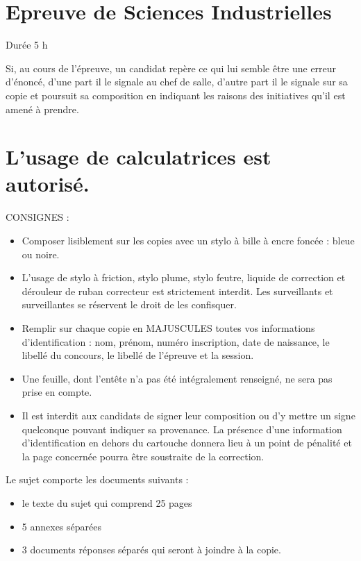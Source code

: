 \documentclass[10pt]{article}
\begin{document}
\captionsetup{singlelinecheck=false}
\section*{Epreuve de Sciences Industrielles}
Durée 5 h

Si, au cours de l'épreuve, un candidat repère ce qui lui semble être une erreur d'énoncé, d'une part il le signale au chef de salle, d'autre part il le signale sur sa copie et poursuit sa composition en indiquant les raisons des initiatives qu'il est amené à prendre.

\section*{L'usage de calculatrices est autorisé.}
CONSIGNES :

\begin{itemize}
  \item[-] Composer lisiblement sur les copies avec un stylo à bille à encre foncée : bleue ou noire.
  \item[-] L'usage de stylo à friction, stylo plume, stylo feutre, liquide de correction et dérouleur de ruban correcteur est strictement interdit. Les surveillants et surveillantes se réservent le droit de les confisquer.
  \item[-] Remplir sur chaque copie en MAJUSCULES toutes vos informations d'identification : nom, prénom, numéro inscription, date de naissance, le libellé du concours, le libellé de l'épreuve et la session.
  \item[-] Une feuille, dont l'entête n'a pas été intégralement renseigné, ne sera pas prise en compte.
  \item[-] Il est interdit aux candidats de signer leur composition ou d'y mettre un signe quelconque pouvant indiquer sa provenance. La présence d'une information d'identification en dehors du cartouche donnera lieu à un point de pénalité et la page concernée pourra être soustraite de la correction.
\end{itemize}

Le sujet comporte les documents suivants :

\begin{itemize}
  \item[-] le texte du sujet qui comprend 25 pages
  \item[-] 5 annexes séparées
  \item[-] 3 documents réponses séparés qui seront à joindre à la copie.
\end{itemize}
\end{document}
